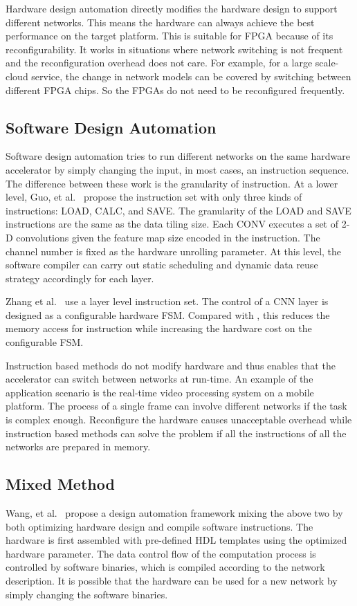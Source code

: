 Hardware design automation directly modifies the hardware design to support different networks. This means the hardware can always achieve the best performance on the target platform. This is suitable for FPGA because of its reconfigurability. It works in situations where network switching is not frequent and the reconfiguration overhead does not care. For example, for a large scale-cloud service, the change in network models can be covered by switching between different FPGA chips. So the FPGAs do not need to be reconfigured frequently.

\subsection{Software Design Automation}

Software design automation tries to run different networks on the same hardware accelerator by simply changing the input, in most cases, an instruction sequence. The difference between these work is the granularity of instruction. At a lower level, Guo, et al.~\cite{guo2017angel} propose the instruction set with only three kinds of instructions: LOAD, CALC, and SAVE. The granularity of the LOAD and SAVE instructions are the same as the data tiling size. Each CONV executes a set of 2-D convolutions given the feature map size encoded in the instruction. The channel number is fixed as the hardware unrolling parameter. At this level, the software compiler can carry out static scheduling and dynamic data reuse strategy accordingly for each layer. 

Zhang et al.~\cite{zhang2016caffeine} use a layer level instruction set. The control of a CNN layer is designed as a configurable hardware FSM. Compared with \cite{guo2017angel}, this reduces the memory access for instruction while increasing the hardware cost on the configurable FSM.

Instruction based methods do not modify hardware and thus enables that the accelerator can switch between networks at run-time. An example of the application scenario is the real-time video processing system on a mobile platform. The process of a single frame can involve different networks if the task is complex enough. Reconfigure the hardware causes unacceptable overhead while instruction based methods can solve the problem if all the instructions of all the networks are prepared in memory. 

\subsection{Mixed Method}
Wang, et al.~\cite{wang2016deepburning} propose a design automation framework mixing the above two by both optimizing hardware design and compile software instructions. The hardware is first assembled with pre-defined HDL templates using the optimized hardware parameter. The data control flow of the computation process is controlled by software binaries, which is compiled according to the network description. It is possible that the hardware can be used for a new network by simply changing the software binaries. 

